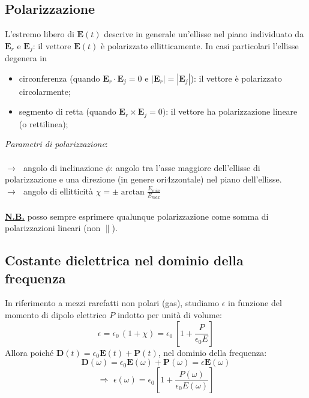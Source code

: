 \documentclass[a4paper]{article}
\begin{document}
\subsection*{Polarizzazione}
L'estremo libero di $\textbf{E}(t)$ descrive in generale un'ellisse nel piano individuato da $\textbf{E}_r$ e $\textbf{E}_j$: il vettore $\textbf{E}(t)$ è polarizzato ellitticamente. In casi particolari l'ellisse degenera in
\begin{itemize}
\item circonferenza (quando $\textbf{E}_r\cdot\textbf{E}_j=0$ e $|\textbf{E}_r|=|\textbf{E}_j|$): il vettore è polarizzato circolarmente;
\item segmento di retta (quando $\textbf{E}_r\times\textbf{E}_j=0$): il vettore ha polarizzazione lineare (o rettilinea);
\end{itemize}
\emph{Parametri di polarizzazione}:\\\\
$\rightarrow\,\,$ angolo di inclinazione $\phi$: angolo tra l'asse maggiore dell'ellisse di polarizzazione e una direzione (in genere ori4zzontale) nel piano dell'ellisse.\\
$\rightarrow\,\,$ angolo di ellitticità $\chi=\pm\arctan\frac{E_{min}}{E_{max}}$\\\\
\underline{\textbf{N.B.}} posso sempre esprimere qualunque polarizzazione come somma di polarizzazioni lineari (non $\parallel$).
\subsection*{Costante dielettrica nel dominio della frequenza}
In riferimento a mezzi rarefatti non polari (gas), studiamo $\epsilon$ in funzione del momento di dipolo elettrico $P$ indotto per unità di volume:
\begin{equation*}
\epsilon=\epsilon_0\,(1+\chi)=\epsilon_0\,\left[1+\frac{P}{\epsilon_0E}\right]
\end{equation*}
Allora poiché $\textbf{D}(t)=\epsilon_0\textbf{E}(t)+\textbf{P}(t)$, nel dominio della frequenza:
\begin{equation*}
\textbf{D}(\omega)=\epsilon_0\textbf{E}(\omega)+\textbf{P}(\omega)=\epsilon\textbf{E}(\omega)
\end{equation*}
\begin{equation*}
\Rightarrow\,\,\epsilon(\omega)=\epsilon_0\left[1+\frac{P(\omega)}{\epsilon_0E(\omega)}\right]
\end{equation*}
\end{document}
